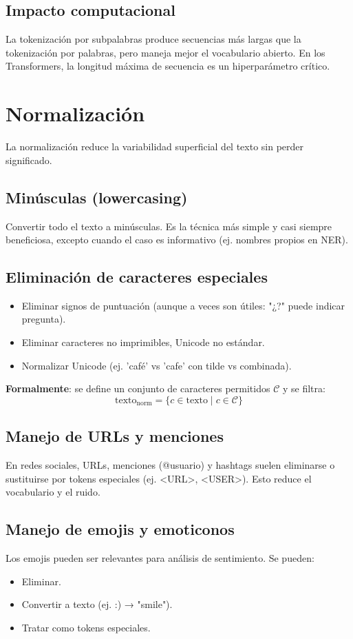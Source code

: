 \documentclass[12pt,a4paper,openany,oneside]{book}
\begin{document}
\subsection{Impacto computacional}
La tokenización por subpalabras produce secuencias más largas que la tokenización por palabras, pero maneja mejor el vocabulario abierto. En los Transformers, la longitud máxima de secuencia es un hiperparámetro crítico.

\section{Normalización}

La normalización reduce la variabilidad superficial del texto sin perder significado.

\subsection{Minúsculas (lowercasing)}
Convertir todo el texto a minúsculas. Es la técnica más simple y casi siempre beneficiosa, excepto cuando el caso es informativo (ej. nombres propios en NER).

\subsection{Eliminación de caracteres especiales}
\begin{itemize}
    \item Eliminar signos de puntuación (aunque a veces son útiles: "¿?" puede indicar pregunta).
    \item Eliminar caracteres no imprimibles, Unicode no estándar.
    \item Normalizar Unicode (ej. 'café' vs 'cafe' con tilde vs combinada).
\end{itemize}

\textbf{Formalmente}: se define un conjunto de caracteres permitidos \( \mathcal{C} \) y se filtra:
\[
\text{texto}_{\text{norm}} = \{ c \in \text{texto} \mid c \in \mathcal{C} \}
\]

\subsection{Manejo de URLs y menciones}
En redes sociales, URLs, menciones (@usuario) y hashtags suelen eliminarse o sustituirse por tokens especiales (ej. <URL>, <USER>). Esto reduce el vocabulario y el ruido.

\subsection{Manejo de emojis y emoticonos}
Los emojis pueden ser relevantes para análisis de sentimiento. Se pueden:
\begin{itemize}
    \item Eliminar.
    \item Convertir a texto (ej. :) → "smile").
    \item Tratar como tokens especiales.
\end{itemize}
\end{document}
